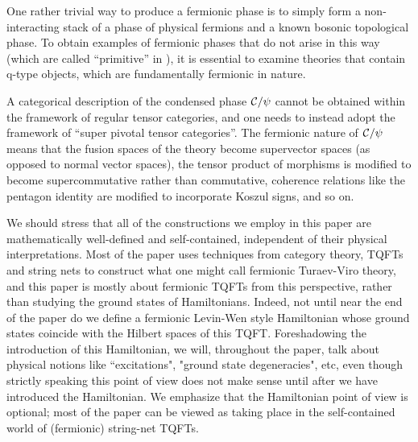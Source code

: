 One rather trivial way to produce a fermionic phase is to simply form a non-interacting stack of a phase of physical fermions 
and a known bosonic topological phase. 
To obtain examples of fermionic phases that do not arise in this way (which are called ``primitive'' in \cite{Lan2016b}),
it is essential to examine theories that contain q-type objects, which are fundamentally fermionic in nature. 

A categorical description of the condensed phase $\mathcal{C} / \psi$ cannot be obtained within the framework 
of regular tensor categories, and one needs to instead adopt the framework of ``super pivotal tensor categories''. 
The fermionic nature of $\mathcal{C} / \psi$ means that the fusion spaces of the theory become supervector spaces 
(as opposed to normal vector spaces),
the tensor product of morphisms is modified to become supercommutative rather than commutative, 
coherence relations like the pentagon identity are modified to incorporate Koszul signs, and so on.

We should stress that all of the constructions we employ in this paper are mathematically well-defined and 
self-contained, independent of their physical interpretations. 
Most of the paper uses techniques from category theory, TQFTs and string nets to construct what one
might call fermionic Turaev-Viro theory, and this paper is mostly about fermionic TQFTs from this perspective, 
rather than studying the ground states of Hamiltonians. 
Indeed, not until near the end of the paper do we define a fermionic Levin-Wen style Hamiltonian whose ground states coincide with 
the Hilbert spaces of this TQFT.
Foreshadowing the introduction of this Hamiltonian, we will, throughout the paper, talk about physical notions like ``excitations", "ground state degeneracies", 
etc, even though
strictly speaking this point of view does not make sense until after we have introduced the Hamiltonian.
We emphasize that the Hamiltonian point of view is optional; most of the paper can be viewed as taking place
in the self-contained world of (fermionic) string-net TQFTs.

